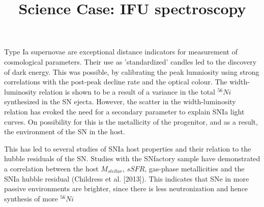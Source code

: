 \documentclass{article}
\begin{document}
\title{Science Case: IFU spectroscopy}
\maketitle
Type Ia supernovae are exceptional distance indicators for measurement of cosmological parameters. Their use as 'standardized' candles led to the discovery of dark energy. This was possible, by calibrating the peak lumniosity using strong correlations with the post-peak decline rate and the optical colour. The width-luminosity relation is shown to be a  result of a variance in the total $^{56}Ni$ synthesized in the SN ejecta. However, the scatter in the width-luminosity relation has evoked the need for a secondary parameter to explain SNIa light curves. On possibility for this is the metallicity of the progenitor, and as a result, the environment of the SN in the host. 

This has led to several studies of SNIa host properties and their relation to the hubble residuals of the SN. Studies with the SNfactory sample have demonstrated a correlation between the host $M_{stellar}$, $sSFR$, gas-phase metallicities and the SNIa hubble residual (Childress et al. [2013]). This indicates that SNe in more passive environments are brighter, since there is less neutronization and hence synthesis of more $^{56}Ni$
\end{document}

